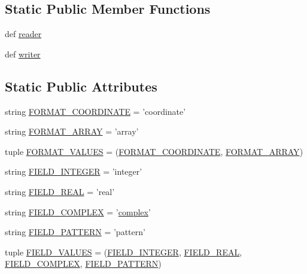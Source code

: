 \subsection*{Static Public Member Functions}
\begin{DoxyCompactItemize}
\item 
def \hyperlink{classscipy_1_1io_1_1mmio_1_1MMFile_a73645479a8ffcd4d3ffd66f60425b234}{reader}
\item 
def \hyperlink{classscipy_1_1io_1_1mmio_1_1MMFile_aac853efe5165967fa50cb2a004cc9e73}{writer}
\end{DoxyCompactItemize}
\subsection*{Static Public Attributes}
\begin{DoxyCompactItemize}
\item 
string \hyperlink{classscipy_1_1io_1_1mmio_1_1MMFile_aa5b094b7ac77009369c7bf097ec2cd87}{F\+O\+R\+M\+A\+T\+\_\+\+C\+O\+O\+R\+D\+I\+N\+A\+T\+E} = 'coordinate'
\item 
string \hyperlink{classscipy_1_1io_1_1mmio_1_1MMFile_aec90e8efb17737b5d7abb3e3bc4b6122}{F\+O\+R\+M\+A\+T\+\_\+\+A\+R\+R\+A\+Y} = 'array'
\item 
tuple \hyperlink{classscipy_1_1io_1_1mmio_1_1MMFile_a31db1877c6b4a1ccabe6325a41a0e276}{F\+O\+R\+M\+A\+T\+\_\+\+V\+A\+L\+U\+E\+S} = (\hyperlink{classscipy_1_1io_1_1mmio_1_1MMFile_aa5b094b7ac77009369c7bf097ec2cd87}{F\+O\+R\+M\+A\+T\+\_\+\+C\+O\+O\+R\+D\+I\+N\+A\+T\+E}, \hyperlink{classscipy_1_1io_1_1mmio_1_1MMFile_aec90e8efb17737b5d7abb3e3bc4b6122}{F\+O\+R\+M\+A\+T\+\_\+\+A\+R\+R\+A\+Y})
\item 
string \hyperlink{classscipy_1_1io_1_1mmio_1_1MMFile_afd738851ff2746ce804f84848c4081bc}{F\+I\+E\+L\+D\+\_\+\+I\+N\+T\+E\+G\+E\+R} = 'integer'
\item 
string \hyperlink{classscipy_1_1io_1_1mmio_1_1MMFile_a4a29deb9211124692c8d8632e533209f}{F\+I\+E\+L\+D\+\_\+\+R\+E\+A\+L} = 'real'
\item 
string \hyperlink{classscipy_1_1io_1_1mmio_1_1MMFile_aa353196891d3c8fce8fbc1e9441c6df6}{F\+I\+E\+L\+D\+\_\+\+C\+O\+M\+P\+L\+E\+X} = '\hyperlink{structcomplex}{complex}'
\item 
string \hyperlink{classscipy_1_1io_1_1mmio_1_1MMFile_acaf0acb4d62552cecd138a057cec3f51}{F\+I\+E\+L\+D\+\_\+\+P\+A\+T\+T\+E\+R\+N} = 'pattern'
\item 
tuple \hyperlink{classscipy_1_1io_1_1mmio_1_1MMFile_a5501d222d1a92eaa7bd9255b61bd12e5}{F\+I\+E\+L\+D\+\_\+\+V\+A\+L\+U\+E\+S} = (\hyperlink{classscipy_1_1io_1_1mmio_1_1MMFile_afd738851ff2746ce804f84848c4081bc}{F\+I\+E\+L\+D\+\_\+\+I\+N\+T\+E\+G\+E\+R}, \hyperlink{classscipy_1_1io_1_1mmio_1_1MMFile_a4a29deb9211124692c8d8632e533209f}{F\+I\+E\+L\+D\+\_\+\+R\+E\+A\+L}, \hyperlink{classscipy_1_1io_1_1mmio_1_1MMFile_aa353196891d3c8fce8fbc1e9441c6df6}{F\+I\+E\+L\+D\+\_\+\+C\+O\+M\+P\+L\+E\+X}, \hyperlink{classscipy_1_1io_1_1mmio_1_1MMFile_acaf0acb4d62552cecd138a057cec3f51}{F\+I\+E\+L\+D\+\_\+\+P\+A\+T\+T\+E\+R\+N})

\end{DoxyCompactItemize}
